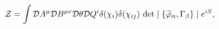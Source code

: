 \begin{equation}
{\cal Z}=\int {\cal D}A^\mu{\cal D}B^{\mu\nu}{\cal D}\theta {\cal
D}Q^i \delta(\chi_i)\delta(\chi_{ij})~ {\rm
det}\mid\{\widetilde{\varphi}_\alpha, \Gamma_\beta \}\mid e^{iS},
\end{equation}

